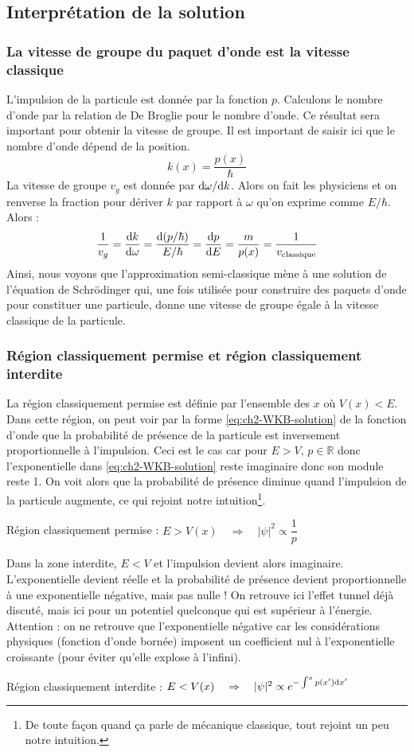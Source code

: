 \documentclass[12pt, a4paper]{book}
\begin{document}
\subsection{Interprétation de la solution}

\subsubsection{La vitesse de groupe du paquet d'onde est la vitesse classique}
L'impulsion de la particule est donnée par la fonction $p$. Calculons le nombre d'onde par la relation de De Broglie pour le nombre d'onde. Ce résultat sera important pour obtenir la vitesse de groupe. Il est important de saisir ici que le nombre d'onde dépend de la position.
$$k(x) = \dfrac{p(x)}{\hbar}$$
La vitesse de groupe $v_g$ est donnée par $\mathrm{d}\omega/\mathrm{d} k$. Alors on fait les physiciens et on renverse la fraction pour dériver $k$ par rapport à $\omega$ qu'on exprime comme $E/\hbar$. Alors :
$$\dfrac{1}{v_g} = \dfrac{\mathrm{d} k}{\mathrm{d} \omega} = \dfrac{\mathrm{d} (p/\hbar)}{E/\hbar} = \dfrac{\mathrm{d} p }{\mathrm{d} E} = \dfrac{m}{p(x)}=  \dfrac{1}{v_{\text{classique}}}$$
Ainsi, nous voyons que l'approximation semi-classique mène à une solution de l'équation de Schrödinger qui, une fois utilisée pour construire des paquets d'onde pour constituer une particule, donne une vitesse de groupe égale à la vitesse classique de la particule.

\subsubsection{Région classiquement permise et région classiquement interdite}
La région classiquement permise est définie par l'ensemble des $x$ où $V(x) < E$. Dans cette région, on peut voir par la forme \ref{eq:ch2-WKB-solution} de la fonction d'onde que la probabilité de présence de la particule est inversement proportionnelle à l'impulsion. Ceci est le cas car pour $E>V$, $p\in \mathbb{R}$ donc l'exponentielle dans \ref{eq:ch2-WKB-solution} reste imaginaire donc son module reste 1. On voit alors que la probabilité de présence diminue quand l'impulsion de la particule augmente, ce qui rejoint notre intuition\footnote{De toute façon quand ça parle de mécanique classique, tout rejoint un peu notre intuition.}.
\begin{center}
  Région classiquement permise : $E>V(x) \quad \Rightarrow \quad |\psi|^2 \propto \dfrac{1}{p}$
\end{center}

Dans la zone interdite, $E<V$ et l'impulsion devient alors imaginaire. L'exponentielle devient réelle et la probabilité de présence devient proportionnelle à une exponentielle négative, mais pas nulle ! On retrouve ici l'effet tunnel déjà discuté, mais ici pour un potentiel quelconque qui est supérieur à l'énergie. Attention : on ne retrouve que l'exponentielle négative car les considérations physiques (fonction d'onde bornée) imposent un coefficient nul à l'exponentielle croissante (pour éviter qu'elle explose à l'infini).
\begin{center}
  Région classiquement interdite : $E<V(x) \quad \Rightarrow \quad |\psi|^2 \propto e^{-\int ^x p(x') \mathrm{d} x'}$
\end{center}
\end{document}
